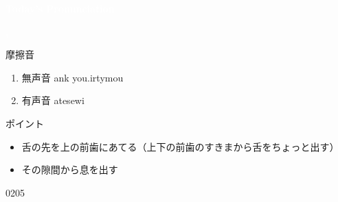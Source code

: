 \documentclass[aspectratio=169,xcolor={dvipsnames,table}]{beamer}
\begin{document}
\begin{frame}
\hypertarget{today}{}

\centering
  \textcolor{white}{\Huge\bfseries Today's Pronunciation}

 \vspace{30pt}

  \textcolor{white}{\Huge\bfseries {}, }

\end{frame}
 \begin{frame}[plain,label=slide_Th]{摩擦音}

\large

\begin{enumerate}
 \item  無声音 \hspace{20pt}ank you.\hspace{1\zw}irty\hspace{1\zw}mou
 \item  有声音 \hspace{20pt}at\hspace{1\zw}ese\hspace{1\zw}wi
\end{enumerate}

\vspace*{20pt}

\normalsize
ポイント

\begin{itemize}[circle]
 \item 舌の先を上の前歯にあてる（上下の前歯のすきまから舌をちょっと出す）
 \item その隙間から息を出す
 
\end{itemize}
\hfill{\tiny 0205}\,{\scriptsize {}}

\hfill\hyperlink{ex}{}

\end{frame}
\end{document}
